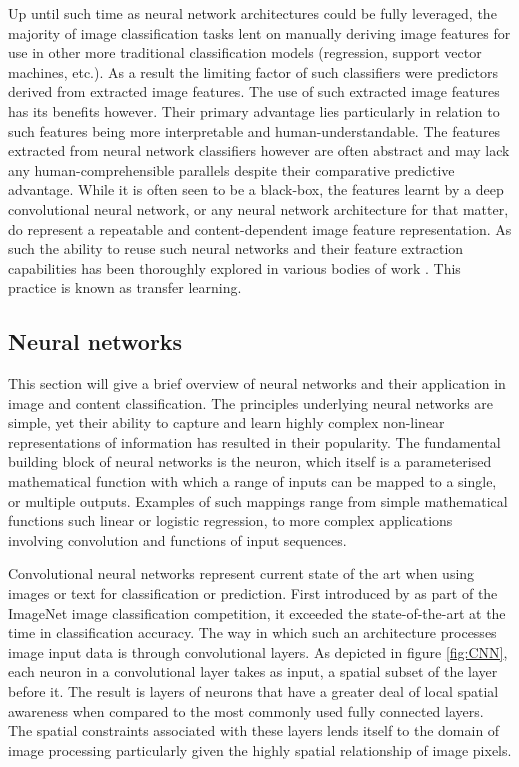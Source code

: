 \documentclass{article}
\begin{document}
Up until such time as neural network architectures could be fully leveraged, the majority of image classification tasks lent on manually deriving image features for use in other more traditional classification models (regression, support vector machines, etc.).
As a result the limiting factor of such classifiers were predictors derived from extracted image features.
The use of such extracted image features has its benefits however.
Their primary advantage lies particularly in relation to such features being more interpretable and human-understandable.
The features extracted from neural network classifiers however are often abstract and may lack any human-comprehensible parallels despite their comparative predictive advantage.
While it is often seen to be a black-box, the features learnt by a deep convolutional neural network, or any neural network architecture for that matter, do represent a repeatable and content-dependent image feature representation.
As such the ability to reuse such neural networks and their feature extraction capabilities has been thoroughly explored in various bodies of work \citep{kim2018building,pan2009survey,you2015robust}.
This practice is known as transfer learning.

\subsection{Neural networks} \label{sec:neural-network-overview}

This section will give a brief overview of neural networks and their application in image and content classification.
The principles underlying neural networks are simple, yet their ability to capture and learn highly complex non-linear representations of information has resulted in their popularity.
The fundamental building block of neural networks is the neuron, which itself is a parameterised mathematical function with which a range of inputs can be mapped to a single, or multiple outputs.
Examples of such mappings range from simple mathematical functions such linear or logistic regression, to more complex applications involving convolution and functions of input sequences.

Convolutional neural networks represent current state of the art when using images or text for classification or prediction.
First introduced by \citet{krizhevsky2012imagenet} as part of the ImageNet image classification competition, it exceeded the state-of-the-art at the time in classification accuracy.
The way in which such an architecture processes image input data is through convolutional layers.
As depicted in figure \ref{fig:CNN}, each neuron in a convolutional layer takes as input, a spatial subset of the layer before it.
The result is layers of neurons that have a greater deal of local spatial awareness when compared to the most commonly used fully connected layers.
The spatial constraints associated with these layers lends itself to the domain of image processing particularly given the highly spatial relationship of image pixels.
\end{document}
